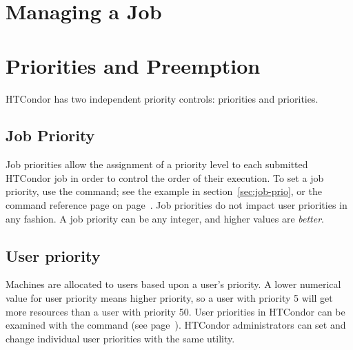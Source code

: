 \section{Managing a Job}


\section{\label{sec:Priorities}Priorities and Preemption}

HTCondor has two independent priority controls: 
priorities and  priorities.  

\subsection{Job Priority}

Job priorities allow the assignment of a priority level to
each submitted HTCondor job in order to
control the order of their execution.
To set a job priority, use the  command;
see the example in section~\ref{sec:job-prio}, or the
command reference page on page~\pageref{man-condor-prio}.
Job priorities do not impact user priorities in any fashion.
A job priority can be any integer, and higher values are \emph{better}.

\subsection{\label{sec:user-priority-explained}User priority}

Machines are allocated to users based upon a user's priority.
A lower numerical value for user priority means higher priority,
so a user with priority 5 will get more resources than
a user with priority 50.
User priorities in HTCondor can be examined with the 
command (see page~\pageref{man-condor-userprio}).
HTCondor administrators can set and change individual user priorities
with the same utility.

